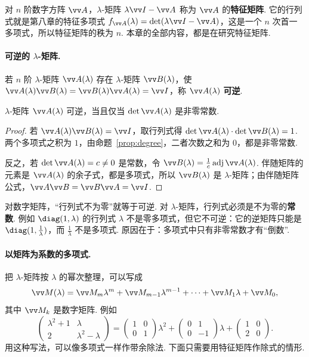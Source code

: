 	对 $n$ 阶数字方阵 $\vv A$，$\lambda$-矩阵 $\lambda\vv I-\vv A$ 称为 $\vv A$ 的\textbf{特征矩阵}. 它的行列式就是第八章的特征多项式 $f_{\vv A}(\lambda)=\det(\lambda\vv I-\vv A)$，这是一个 $n$ 次首一多项式，所以特征矩阵的秩为 $n$. 本章的全部内容，都是在研究特征矩阵.
	
	\paragraph*{可逆的 $\lambda$-矩阵.} 若 $n$ 阶 $\lambda$-矩阵 $\vv A(\lambda)$ 存在 $\lambda$-矩阵 $\vv B(\lambda)$，使 $\vv A(\lambda)\vv B(\lambda)=\vv B(\lambda)\vv A(\lambda)=\vv I$，称 $\vv A(\lambda)$ \textbf{可逆}.
	
	\begin{theorem}\label{thm:lambdainv}
		$\lambda$-矩阵 $\vv A(\lambda)$ 可逆，当且仅当 $\det\vv A(\lambda)$ 是非零常数.
	\end{theorem}
	\begin{proof}
		若 $\vv A(\lambda)\vv B(\lambda)=\vv I$，取行列式得 $\det\vv A(\lambda)\cdot\det\vv B(\lambda)=1$. 两个多项式之积为 $1$，由命题~\ref{prop:degree}，二者次数之和为 $0$，都是非零常数.
		
		反之，若 $\det\vv A(\lambda)=c\ne0$ 是常数，令 $\vv B(\lambda)=\frac1c\operatorname{adj}\vv A(\lambda)$. 伴随矩阵的元素是 $\vv A(\lambda)$ 的余子式，都是多项式，所以 $\vv B(\lambda)$ 是 $\lambda$-矩阵；由伴随矩阵公式，$\vv A\vv B=\vv B\vv A=\vv I$.
	\end{proof}
	
	\begin{pitfallbox}
		对数字矩阵，“行列式不为零”就等于可逆. 对 $\lambda$-矩阵，行列式必须是不为零的\textbf{常数}. 例如 $\diag(1,\lambda)$ 的行列式 $\lambda$ 不是零多项式，但它不可逆：它的逆矩阵只能是 $\diag(1,\frac1\lambda)$，而 $\frac1\lambda$ 不是多项式. 原因在于：多项式中只有非零常数才有“倒数”.
	\end{pitfallbox}
	
	\paragraph*{以矩阵为系数的多项式.} 把 $\lambda$-矩阵按 $\lambda$ 的幂次整理，可以写成
	\[\vv M(\lambda)=\vv M_m\lambda^m+\vv M_{m-1}\lambda^{m-1}+\cdots+\vv M_1\lambda+\vv M_0,\]
	其中 $\vv M_k$ 是数字矩阵. 例如
	\[\begin{pmatrix}\lambda^2+1&\lambda\\2&\lambda^2-\lambda\end{pmatrix}=\begin{pmatrix}1&0\\0&1\end{pmatrix}\lambda^2+\begin{pmatrix}0&1\\0&-1\end{pmatrix}\lambda+\begin{pmatrix}1&0\\2&0\end{pmatrix}.\]
	用这种写法，可以像多项式一样作带余除法. 下面只需要用特征矩阵作除式的情形.
	
